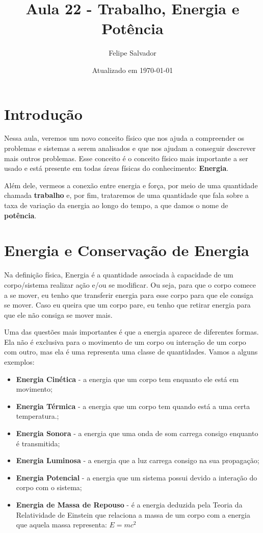 \documentclass[12pt]{extarticle}
\title{Aula 22 - Trabalho, Energia e Potência}
\author{Felipe Salvador}
\date{Atualizado em \today}
\newcommand{\<}{\langle}
\renewcommand{\>}{\rangle}
\theoremstyle{definition}
\begin{document}
\maketitle

\section{Introdução}
Nessa aula, veremos um novo conceito físico que nos ajuda a compreender os problemas e sistemas a serem analisados e que nos ajudam a conseguir descrever mais outros problemas. Esse conceito é o conceito físico mais importante a ser usado e está presente em todas áreas físicas do conhecimento: \textbf{Energia}.

Além dele, vermeos a conexão entre energia e força, por meio de uma quantidade chamada \textbf{trabalho} e, por fim, trataremos de uma quantidade que fala sobre a taxa de variação da energia ao longo do tempo, a que damos o nome de \textbf{potência}.

\section{Energia e Conservação de Energia}
Na definição física, Energia é a quantidade associada à capacidade de um corpo/sistema realizar ação e/ou se modificar. Ou seja, para que o corpo comece a se mover, eu tenho que transferir energia para esse corpo para que ele consiga se mover. Caso eu queira que um corpo pare, eu tenho que retirar energia para que ele não consiga se mover mais.

Uma das questões mais importantes é que a energia aparece de diferentes formas. Ela não é exclusiva para o movimento de um corpo ou interação de um corpo com outro, mas ela é uma representa uma classe de quantidades. Vamos a alguns exemplos:
\begin{itemize}
    \item \textbf{Energia Cinética} - a energia que um corpo tem enquanto ele está em movimento;
    \item \textbf{Energia Térmica} - a energia que um corpo tem quando está a uma certa temperatura.;
    \item \textbf{Energia Sonora} - a energia que uma onda de som carrega consigo enquanto é transmitida;
    \item \textbf{Energia Luminosa} - a energia que a luz carrega consigo na sua propagação; 
    \item \textbf{Energia Potencial} - a energia que um sistema possui devido a interação do corpo com o sistema;
    \item \textbf{Energia de Massa de Repouso} - é a energia deduzida pela Teoria da Relatividade de Einstein que relaciona a massa de um corpo com a energia que aquela massa representa: $E=mc^2$
\end{itemize}
\end{document}
